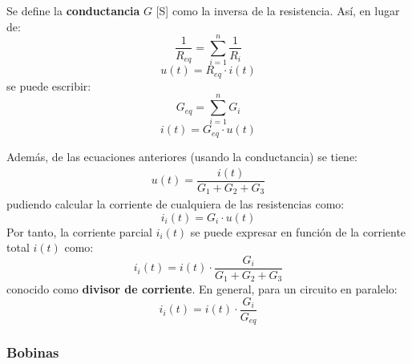 		Se define la \textbf{conductancia} $G$ [S] como la
                inversa de la resistencia. Así, en lugar de:
		\begin{equation*}
                  \dfrac{1}{R_{eq}} = \sum_{i = 1}^n \dfrac{1}{R_i}
		\end{equation*}
		\begin{equation*}
                  u(t) = R_{eq} \cdot i(t)
		\end{equation*}
		se puede escribir:
		\begin{equation}
                  \boxed{G_{eq} = \sum_{i = 1}^n G_i}
		\end{equation}
		\begin{equation*}
                  i(t) = G_{eq} \cdot u(t)
		\end{equation*}
		
		Además, de las ecuaciones anteriores (usando la
                conductancia) se tiene:
		\begin{align*}
                  u(t) = \dfrac{i(t)}{G_1 + G_2 + G_3}
		\end{align*}
		pudiendo calcular la corriente de cualquiera de las
                resistencias como:
		\begin{equation*}
                  i_i(t) = G_i \cdot u(t)
		\end{equation*}
		Por tanto, la corriente parcial $i_i(t)$ se puede
                expresar en función de la corriente total $i(t)$ como:
		\begin{equation*}
                  i_i(t) = i(t) \cdot \dfrac{G_i}{G_1 + G_2 + G_3}
		\end{equation*}
		conocido como \textbf{divisor de corriente}. En
                general, para un circuito en paralelo:
		\begin{equation}
                  \boxed{i_i(t) = i(t) \cdot \frac{G_i}{G_{eq}}}
		\end{equation}
		
		\subsubsection{Bobinas}
		

